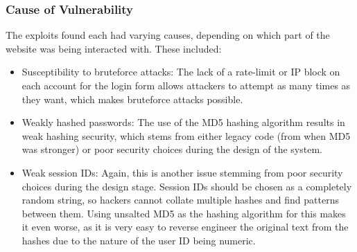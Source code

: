 \documentclass{report}
\begin{document}
\subsubsection{Cause of Vulnerability}
The exploits found each had varying causes, depending on which part of the website was being interacted with. These included:
\begin{itemize}
	\item Susceptibility to bruteforce attacks: The lack of a rate-limit or IP block on each account for the login form allows attackers to attempt as many times as they want, which makes bruteforce attacks possible. 
	\item Weakly hashed passwords: The use of the MD5 hashing algorithm results in weak hashing security, which stems from either legacy code (from when MD5 was stronger) or poor security choices during the design of the system.
	\item Weak session IDs: Again, this is another issue stemming from poor security choices during the design stage. Session IDs should be chosen as a completely random string, so hackers cannot collate multiple hashes and find patterns between them. Using unsalted MD5 as the hashing algorithm for this makes it even worse, as it is very easy to reverse engineer the original text from the hashes due to the nature of the user ID being numeric.
\end{itemize}
\end{document}
